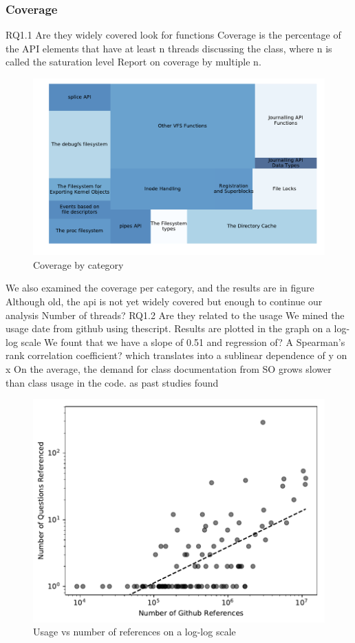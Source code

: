 \subsubsection{Coverage}
RQ1.1
Are they widely covered
look for functions
Coverage is the percentage of the API elements that have at least n threads discussing
the class, where n is called the saturation level
Report on coverage by multiple n. %
\begin{figure}
  \includegraphics{scripts/figures/1-1-coveragebycategory.pdf}
  \caption{Coverage by category}
  \label{fig:covbycategory}
\end{figure}

We also examined the coverage per category, and the results are in figure
Although old, the api is not yet widely covered
but enough to continue our analysis
Number of threads? %
RQ1.2
Are they related to the usage
We mined the usage date from github using thescript.
Results are plotted in the graph on a log-log scale
We fount that we have a slope of 0.51 and regression of? %
A Spearman’s rank correlation coefficient?
which translates into a sublinear dependence of y on x
On the average, the demand for class documentation from SO grows slower
than class usage in the code. as past studies found


\begin{figure}
  \includegraphics{scripts/figures/1-2-usage-vs-coverage}
  \caption{Usage vs number of references on a log-log scale}
  \label{fig:usageref}
\end{figure}

